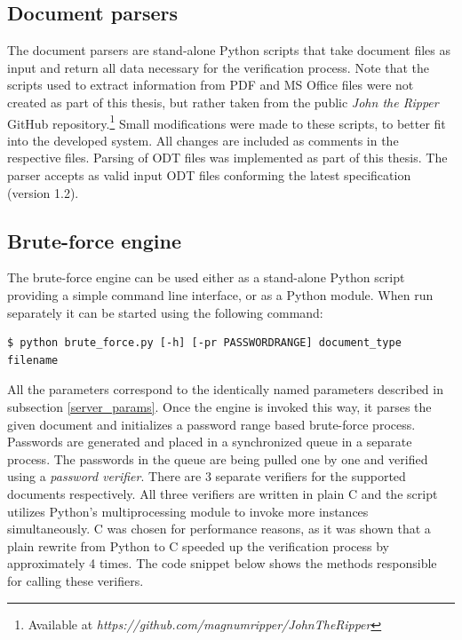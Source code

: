 \documentclass[11pt,oneside]{fithesis2}
\begin{document}
\subsection{Document parsers} \label{doc_parsers}

The document parsers are stand-alone Python scripts that take document files as input and return all  data necessary for the verification process. Note that the scripts used to extract information from PDF and MS Office files were not created as part of this thesis, but rather taken from the public \textit{John the Ripper} GitHub repository.\footnote{Available at \textit{https://github.com/magnumripper/JohnTheRipper}} Small modifications were made to these scripts, to better fit into the developed system. All changes are included as comments in the respective files. Parsing of ODT files was implemented as part of this thesis. The parser accepts as valid input ODT files conforming the latest specification (version 1.2).

\subsection{Brute-force engine}\label{brute_force_engine}

The brute-force engine can be used either as a stand-alone Python script providing a simple command line interface, or as a Python module. When run separately it can be started using the following command:

\begin{lstlisting}
$ python brute_force.py [-h] [-pr PASSWORDRANGE] document_type filename
\end{lstlisting}

All the parameters correspond to the identically named parameters described in subsection \ref{server_params}. Once the engine is invoked this way, it parses the given document and initializes a password range based brute-force process. Passwords are generated and placed in a synchronized queue in a separate process. The passwords in the queue are being pulled one by one and verified using a \textit{password verifier}. There are 3 separate verifiers for the supported documents respectively. All three verifiers are written in plain C and the script utilizes Python's multiprocessing module to invoke more instances simultaneously. C was chosen for performance reasons, as it was shown that a plain rewrite from Python to C speeded up the verification process by approximately 4 times. The code snippet below shows the methods responsible for calling these verifiers.
\end{document}
